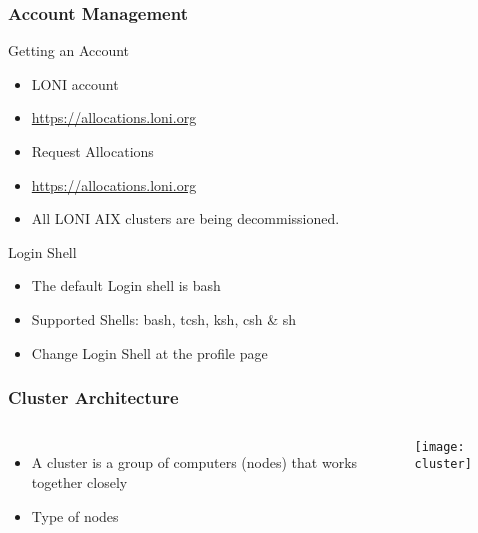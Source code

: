 \documentclass[slidestop,mathserif,compress,xcolor=svgnames,table]{beamer}
\newenvironment{bblock}[0]
{
\begin{beamerboxesrounded}[upper=uppercol1,lower=lowercol1,shadow=true]}
{\end{beamerboxesrounded}}
\newenvironment{eblock}[0]
{
\begin{beamerboxesrounded}[upper=uppercol2,lower=lowercol2,shadow=true]}
{\end{beamerboxesrounded}}
\begin{document}
\begin{frame}
  \frametitle{\small Account Management}
  \begin{bblock}{Getting an Account}
    \begin{itemize}
      \item LONI account
      \item[] \url{https://allocations.loni.org}
      \item Request Allocations
      \item[] \url{https://allocations.loni.org}
      \item All LONI AIX clusters are being decommissioned.
    \end{itemize}
  \end{bblock}

  \begin{eblock}{Login Shell}
    \begin{itemize}
      \item The default Login shell is bash
      \item Supported Shells: bash, tcsh, ksh, csh \& sh
      \item Change Login Shell at the profile page
    \end{itemize}
   \end{eblock}
\end{frame}

\begin{frame}
  \frametitle{\small Cluster Architecture}
  \begin{columns}
    \column{4cm}
    \begin{itemize}
      \item A cluster is a group of computers (nodes) that works together closely
      \item Type of nodes
    \end{itemize}
    \column{7cm}
    \begin{center}
      \texttt{[image: cluster]}
    \end{center}
  \end{columns}
\end{frame}
\end{document}
